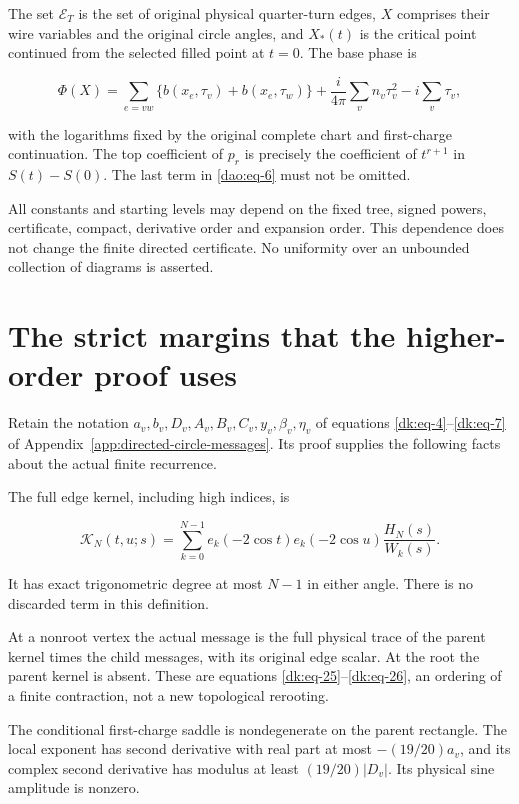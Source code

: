 The set \(\mathcal E_T\) is the set of original physical quarter-turn edges, \(X\) comprises their wire variables and the original circle angles, and \(X_*(t)\) is the critical point continued from the selected filled point at \(t=0\). The base phase is

\begin{equation}\label{dao:eq-6}
\Phi(X)=\sum_{e=vw}\{b(x_e,\tau_v)+b(x_e,\tau_w)\}
       +\frac{i}{4\pi}\sum_v n_v\tau_v^2-i\sum_v\tau_v,
\end{equation}

with the logarithms fixed by the original complete chart and first-charge continuation. The top coefficient of \(p_r\) is precisely the coefficient of \(t^{r+1}\) in \(S(t)-S(0)\). The last term in \eqref{dao:eq-6} must not be omitted.

All constants and starting levels may depend on the fixed tree, signed powers, certificate, compact, derivative order and expansion order. This dependence does not change the finite directed certificate. No uniformity over an unbounded collection of diagrams is asserted.

\section{The strict margins that the higher-order proof uses}\label{dao:sec-2}

Retain the notation \(a_v,b_v,D_v,A_v,B_v,C_v,y_v,\beta_v,\eta_v\) of equations \eqref{dk:eq-4}--\eqref{dk:eq-7} of Appendix~\ref{app:directed-circle-messages}. Its proof supplies the following facts about the actual finite recurrence.

The full edge kernel, including high indices, is

\begin{equation}\label{dao:eq-7}
\mathscr K_N(t,u;s)=\sum_{k=0}^{N-1}
 e_k(-2\cos t)e_k(-2\cos u)\frac{H_N(s)}{W_k(s)}.
\end{equation}

It has exact trigonometric degree at most \(N-1\) in either angle. There is no discarded term in this definition.

At a nonroot vertex the actual message is the full physical trace of the parent kernel times the child messages, with its original edge scalar. At the root the parent kernel is absent. These are equations \eqref{dk:eq-25}--\eqref{dk:eq-26}, an ordering of a finite contraction, not a new topological rerooting.

The conditional first-charge saddle is nondegenerate on the parent rectangle. The local exponent has second derivative with real part at most \(-(19/20)a_v\), and its complex second derivative has modulus at least \((19/20)|D_v|\). Its physical sine amplitude is nonzero.

